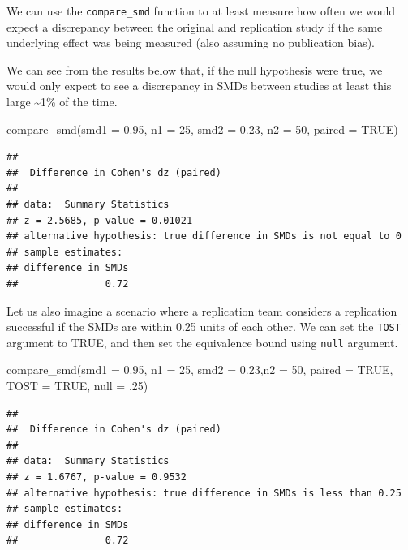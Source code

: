 \documentclass[]{interact}
\theoremstyle{plain}%
\theoremstyle{definition}
\theoremstyle{remark}
\newenvironment{Shaded}{\begin{snugshade}}{\end{snugshade}}
\newcommand{\AttributeTok}[1]{\textcolor[rgb]{0.77,0.63,0.00}{#1}}
\newcommand{\ConstantTok}[1]{\textcolor[rgb]{0.00,0.00,0.00}{#1}}
\newcommand{\DecValTok}[1]{\textcolor[rgb]{0.00,0.00,0.81}{#1}}
\newcommand{\FloatTok}[1]{\textcolor[rgb]{0.00,0.00,0.81}{#1}}
\newcommand{\FunctionTok}[1]{\textcolor[rgb]{0.00,0.00,0.00}{#1}}
\newcommand{\NormalTok}[1]{#1}
\begin{document}
We can use the \texttt{compare\_smd} function to at least measure how
often we would expect a discrepancy between the original and replication
study if the same underlying effect was being measured (also assuming no
publication bias).

We can see from the results below that, if the null hypothesis were
true, we would only expect to see a discrepancy in SMDs between studies
at least this large \textasciitilde1\% of the time.

\begin{Shaded}
\begin{Highlighting}[]
\FunctionTok{compare\_smd}\NormalTok{(}\AttributeTok{smd1 =} \FloatTok{0.95}\NormalTok{,}
            \AttributeTok{n1 =} \DecValTok{25}\NormalTok{,}
            \AttributeTok{smd2 =} \FloatTok{0.23}\NormalTok{,}
            \AttributeTok{n2 =} \DecValTok{50}\NormalTok{,}
            \AttributeTok{paired =} \ConstantTok{TRUE}\NormalTok{)}
\end{Highlighting}
\end{Shaded}

\begin{verbatim}
## 
##  Difference in Cohen's dz (paired)
## 
## data:  Summary Statistics
## z = 2.5685, p-value = 0.01021
## alternative hypothesis: true difference in SMDs is not equal to 0
## sample estimates:
## difference in SMDs 
##               0.72
\end{verbatim}

Let us also imagine a scenario where a replication team considers a
replication successful if the SMDs are within 0.25 units of each other.
We can set the \texttt{TOST} argument to TRUE, and then set the
equivalence bound using \texttt{null} argument.

\begin{Shaded}
\begin{Highlighting}[]
\FunctionTok{compare\_smd}\NormalTok{(}\AttributeTok{smd1 =} \FloatTok{0.95}\NormalTok{, }\AttributeTok{n1 =} \DecValTok{25}\NormalTok{, }\AttributeTok{smd2 =} \FloatTok{0.23}\NormalTok{,}\AttributeTok{n2 =} \DecValTok{50}\NormalTok{,}
            \AttributeTok{paired =} \ConstantTok{TRUE}\NormalTok{, }\AttributeTok{TOST =} \ConstantTok{TRUE}\NormalTok{, }\AttributeTok{null =}\NormalTok{ .}\DecValTok{25}\NormalTok{)}
\end{Highlighting}
\end{Shaded}

\begin{verbatim}
## 
##  Difference in Cohen's dz (paired)
## 
## data:  Summary Statistics
## z = 1.6767, p-value = 0.9532
## alternative hypothesis: true difference in SMDs is less than 0.25
## sample estimates:
## difference in SMDs 
##               0.72
\end{verbatim}
\end{document}

